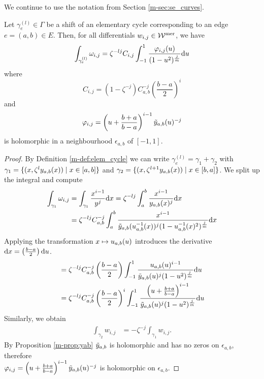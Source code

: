 \documentclass[main.tex]{subfiles}
\begin{document}
  We continue to use the notation from Section \ref{m-sec:se_curves}.

  \begin{thm}\label{thm:periods}
   Let $\gamma_e^{(l)} \in \Gamma$ be a shift of an elementary cycle corresponding
   to an edge $e = (a,b) \in E$. Then, for all differentials $w_{i,j} \in \mathcal{W}^{\text{mer}}$, we have
   \begin{equation}\label{eq:periods} 
      \int_{\gamma_e^{(l)}} \omega_{i,j}  =  \zeta^{-lj} C_{i,j} \int_{-1}^1 \frac{\varphi_{i,j}(u)}{(1-u^2)^{\frac{j}{m}}}  \mathrm d u
   \end{equation}
   where
   \begin{equation}
    C_{i,j}   =  (1-\zeta^{-j}) C_{a,b}^{-j} \left(\frac{b-a}{2}\right)^i
   \end{equation}
   and 
   \begin{equation}
    \varphi_{i,j}  = \left(u+\frac{b+a}{b-a}\right)^{i-1} \tilde{y}_{a,b}(u)^{-j}
   \end{equation}
   is holomorphic in a neighbourhood $\epsilon_{a,b}$ of $[-1,1]$.
  \end{thm}
  \begin{proof}
    By Definition \ref{m-def:elem_cycle} we can write $\gamma_e^{(l)} = \gamma_1 + \gamma_2$ with $\gamma_1 = \{  (x,\zeta^l y_{a,b}(x))  \mid  x \in [a,b]  \}$ and
    $\gamma_2 = \{  (x,\zeta^{l+1}y_{a,b}(x))  \mid  x \in [b,a]  \}$. We split up the integral and compute
    \begin{align}\label{eq:thm_periods_2}
     \int_{\gamma_1} \omega_{i,j}  & =  \int_{\gamma_1} \frac{x^{i-1}}{y^j}  \mathrm d x  =  \zeta^{-lj} \int_a^b \frac{x^{i-1}}{y_{a,b}(x)^j}  \mathrm d x \\  & =
     \zeta^{-lj} C_{a,b}^{-j}   \int_a^b \frac{x^{i-1}}{\tilde{y}_{a,b}(u_{a,b}^{-1}(x))^j (1-u_{a,b}^{-1}(x)^2)^{\frac{j}{m}}}  \mathrm d x
  \end{align}
  Applying the transformation $x \mapsto u_{a,b}(u)$ introduces the derivative $\mathrm d x = \left(\frac{b-a}{2}\right) \mathrm d u$.
  \begin{align}
   & = \zeta^{-lj} C_{a,b}^{-j} \left(\frac{b-a}{2}\right) \int_{-1}^1 \frac{u_{a,b}(u)^{i-1}}{\tilde{y}_{a,b}(u)^j (1-u^2)^{\frac{j}{m}}}  \mathrm d u \\ & = 
    \zeta^{-lj} C_{a,b}^{-j} \left(\frac{b-a}{2}\right)^i \int_{-1}^1 \frac{\left(u+\frac{b+a}{b-a}\right)^{i-1}}{\tilde{y}_{a,b}(u)^j (1-u^2)^{\frac{j}{m}}}  \mathrm d u
  \end{align}
  Similarly, we obtain
  \begin{align}
        \int_{\gamma_2} w_{i,j}  & =  -\zeta^{-j} \int_{\gamma_1} w_{i,j}.
  \end{align}
  By Proposition \ref{m-prop:yab} $\tilde{y}_{a,b}$ is holomorphic and has no zeros on $\epsilon_{a,b}$, therefore \\ $\varphi_{i,j}  = \left(u+\frac{b+a}{b-a}\right)^{i-1} \tilde{y}_{a,b}(u)^{-j}$
  is holomorphic on $\epsilon_{a,b}$.
  \end{proof}
\end{document}
